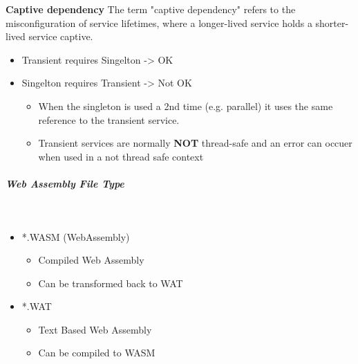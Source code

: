 \documentclass[10pt,twoside,landscape]{article}
\begin{document}
\begin{multicols}{4}
\textbf{Captive dependency}
The term "captive dependency" refers to the misconfiguration of service lifetimes, where a longer-lived service holds a shorter-lived service captive.
\begin{itemize}
\item Transient requires Singelton -> OK
\item Singelton requires Transient -> Not OK
\begin{itemize}
\item When the singleton is used a 2nd time (e.g. parallel) it uses the same reference to the transient service.
\item Transient services are normally \textbf{NOT} thread-safe and an error can occuer when used in a not thread safe context
\end{itemize}
\end{itemize}
\subparagraph{Web Assembly File Type} \
\label{sec:org9a206ff}
\begin{itemize}
\item *.WASM (WebAssembly)
\begin{itemize}
\item Compiled Web Assembly
\item Can be transformed back to WAT
\end{itemize}

\item *.WAT
\begin{itemize}
\item Text Based Web Assembly
\item Can be compiled to WASM
\end{itemize}


\end{itemize}
\end{multicols}
\end{document}
